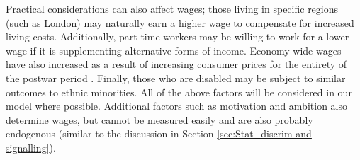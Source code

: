 \documentclass[class=article, crop=false]{standalone}
\begin{document}
Practical considerations can also affect wages; those living in specific regions (such as London) may naturally earn a higher wage to compensate for increased living costs. Additionally, part-time workers may be willing to work for a lower wage if it is supplementing alternative forms of income. Economy-wide wages have also increased as a result of increasing consumer prices for the entirety of the postwar period \citep{WorldBank}. Finally, those who are disabled may be subject to similar outcomes to ethnic minorities. All of the above factors will be considered in our model where possible. Additional factors such as motivation and ambition also determine wages, but cannot be measured easily and are also probably endogenous (similar to the discussion in Section \ref{sec:Stat_discrim and signalling}).

\ifstandalone

\fi
\end{document}
